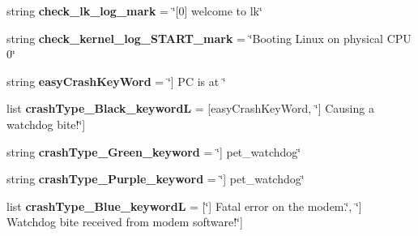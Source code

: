 \begin{DoxyCompactItemize}
\item 
\hypertarget{classsuker_r_d_a_1_1rda_pkg_1_1suker_r_d_a_body_1_1abstractor_body_a3ce803f204d5788dd2c33b0f24739b11}{string {\bfseries check\+\_\+lk\+\_\+log\+\_\+mark} = \char`\"{}\mbox{[}0\mbox{]} welcome to lk\char`\"{}}\label{classsuker_r_d_a_1_1rda_pkg_1_1suker_r_d_a_body_1_1abstractor_body_a3ce803f204d5788dd2c33b0f24739b11}

\item 
\hypertarget{classsuker_r_d_a_1_1rda_pkg_1_1suker_r_d_a_body_1_1abstractor_body_a6835b0acb19b9a2c9fa2e290b0bc871a}{string {\bfseries check\+\_\+kernel\+\_\+log\+\_\+\+S\+T\+A\+R\+T\+\_\+mark} = \char`\"{}Booting Linux on physical C\+P\+U 0\char`\"{}}\label{classsuker_r_d_a_1_1rda_pkg_1_1suker_r_d_a_body_1_1abstractor_body_a6835b0acb19b9a2c9fa2e290b0bc871a}

\item 
\hypertarget{classsuker_r_d_a_1_1rda_pkg_1_1suker_r_d_a_body_1_1abstractor_body_ab68436a6a555a1c3d8da63420177b249}{string {\bfseries easy\+Crash\+Key\+Word} = \char`\"{}\mbox{]} P\+C is at \char`\"{}}\label{classsuker_r_d_a_1_1rda_pkg_1_1suker_r_d_a_body_1_1abstractor_body_ab68436a6a555a1c3d8da63420177b249}

\item 
\hypertarget{classsuker_r_d_a_1_1rda_pkg_1_1suker_r_d_a_body_1_1abstractor_body_a56ce4582276be398a3d61d15cf68b467}{list {\bfseries crash\+Type\+\_\+\+Black\+\_\+keyword\+L} = \mbox{[}easy\+Crash\+Key\+Word, \char`\"{}\mbox{]} Causing a watchdog bite!\char`\"{}\mbox{]}}\label{classsuker_r_d_a_1_1rda_pkg_1_1suker_r_d_a_body_1_1abstractor_body_a56ce4582276be398a3d61d15cf68b467}

\item 
\hypertarget{classsuker_r_d_a_1_1rda_pkg_1_1suker_r_d_a_body_1_1abstractor_body_a0048f2ba7b92d33a26a71ff4d85f7d6d}{string {\bfseries crash\+Type\+\_\+\+Green\+\_\+keyword} = \char`\"{}\mbox{]} pet\+\_\+watchdog\char`\"{}}\label{classsuker_r_d_a_1_1rda_pkg_1_1suker_r_d_a_body_1_1abstractor_body_a0048f2ba7b92d33a26a71ff4d85f7d6d}

\item 
\hypertarget{classsuker_r_d_a_1_1rda_pkg_1_1suker_r_d_a_body_1_1abstractor_body_a7faf4175e6975b7940ba7ada3ab675a7}{string {\bfseries crash\+Type\+\_\+\+Purple\+\_\+keyword} = \char`\"{}\mbox{]} pet\+\_\+watchdog\char`\"{}}\label{classsuker_r_d_a_1_1rda_pkg_1_1suker_r_d_a_body_1_1abstractor_body_a7faf4175e6975b7940ba7ada3ab675a7}

\item 
\hypertarget{classsuker_r_d_a_1_1rda_pkg_1_1suker_r_d_a_body_1_1abstractor_body_a2cf054e30d57363ac70f48ba7ea28f79}{list {\bfseries crash\+Type\+\_\+\+Blue\+\_\+keyword\+L} = \mbox{[}\char`\"{}\mbox{]} Fatal error on the modem.\char`\"{}, \char`\"{}\mbox{]} Watchdog bite received from modem software!\char`\"{}\mbox{]}}\label{classsuker_r_d_a_1_1rda_pkg_1_1suker_r_d_a_body_1_1abstractor_body_a2cf054e30d57363ac70f48ba7ea28f79}


\end{DoxyCompactItemize}
